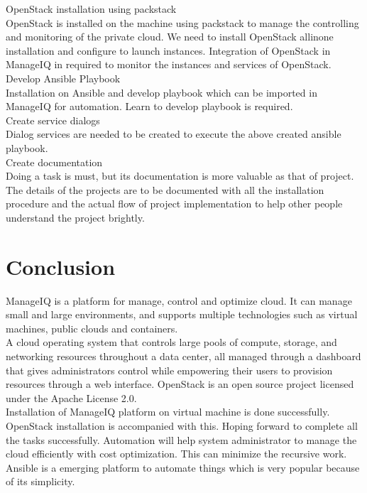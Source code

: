 \documentclass[a4paper,12pt]{report}
\begin{document}
OpenStack installation using packstack\\

OpenStack is installed on the machine using packstack to manage the controlling and monitoring of the private cloud. We need to install OpenStack allinone installation and configure to launch instances. Integration of OpenStack in ManageIQ in required to monitor the instances and services of OpenStack.\\

Develop Ansible Playbook\\

Installation on Ansible and develop playbook which can be imported in ManageIQ for automation. Learn to develop playbook is required. \\

Create service dialogs\\
Dialog services are needed to be created to execute the above created ansible playbook.\\

Create documentation\\
Doing a task is must, but its documentation is more valuable as that of project. The details of the projects are to be documented with all the installation procedure and the actual flow of project implementation to help other people understand the project brightly.

\chapter{Conclusion}

ManageIQ is a platform for manage, control and optimize cloud. It can manage small and large environments, and supports multiple technologies such as virtual machines, public clouds and containers.\\

A cloud operating system that controls large pools of compute, storage, and networking resources throughout a data center, all managed through a dashboard that gives administrators control while empowering their users to provision resources through a web interface. OpenStack is an open source project licensed under the Apache License 2.0.\\
    
Installation of ManageIQ platform on virtual machine is done successfully. OpenStack installation is accompanied with this. Hoping forward to complete all the tasks successfully. Automation will help system administrator to manage the cloud efficiently with cost optimization. This can minimize the recursive work. Ansible is a emerging platform to automate things which is very popular because of its simplicity.
\end{document}

